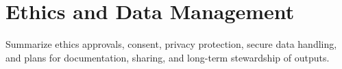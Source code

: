 \section{Ethics and Data Management}

Summarize ethics approvals, consent, privacy protection, secure data
handling, and plans for documentation, sharing, and long-term
stewardship of outputs.
